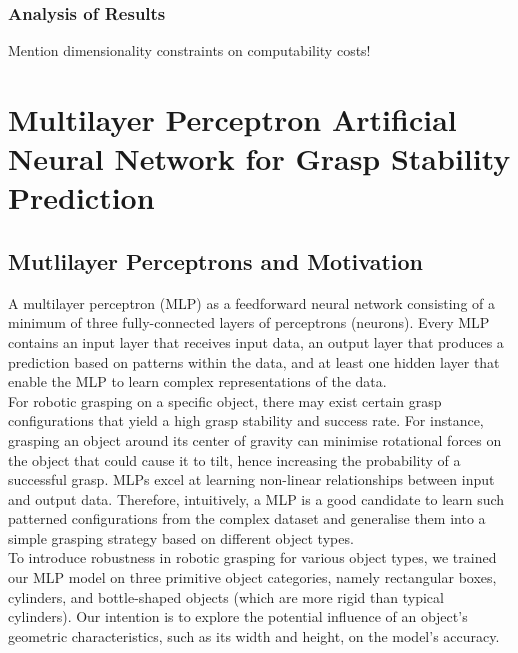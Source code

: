 \documentclass[11pt, a4paper]{report}
\theoremstyle{definition}
\begin{document}
\subsection{Analysis of Results}
\label{sec:4.6.2}
Mention dimensionality constraints on computability costs!



\chapter{Multilayer Perceptron Artificial Neural Network for Grasp Stability Prediction}
\label{chap:5}

\section{Mutlilayer Perceptrons and Motivation}
\label{sec:5.1}
A multilayer perceptron (MLP) as a feedforward neural network consisting of a minimum of three fully-connected layers of perceptrons (neurons). Every MLP contains an input layer that receives input data, an output layer that produces a prediction based on patterns within the data, and at least one hidden layer that enable the MLP to learn complex representations of the data.\\

For robotic grasping on a specific object, there may exist certain grasp configurations that yield a high grasp stability and success rate. For instance, grasping an object around its center of gravity can minimise rotational forces on the object that could cause it to tilt, hence increasing the probability of a successful grasp. MLPs excel at learning non-linear relationships between input and output data. Therefore, intuitively, a MLP is a good candidate to learn such patterned configurations from the complex dataset and generalise them into a simple grasping strategy based on different object types.\\

To introduce robustness in robotic grasping for various object types, we trained our MLP model on three primitive object categories, namely rectangular boxes, cylinders, and bottle-shaped objects (which are more rigid than typical cylinders). Our intention is to explore the potential influence of an object's geometric characteristics, such as its width and height, on the model's accuracy.
\end{document}
